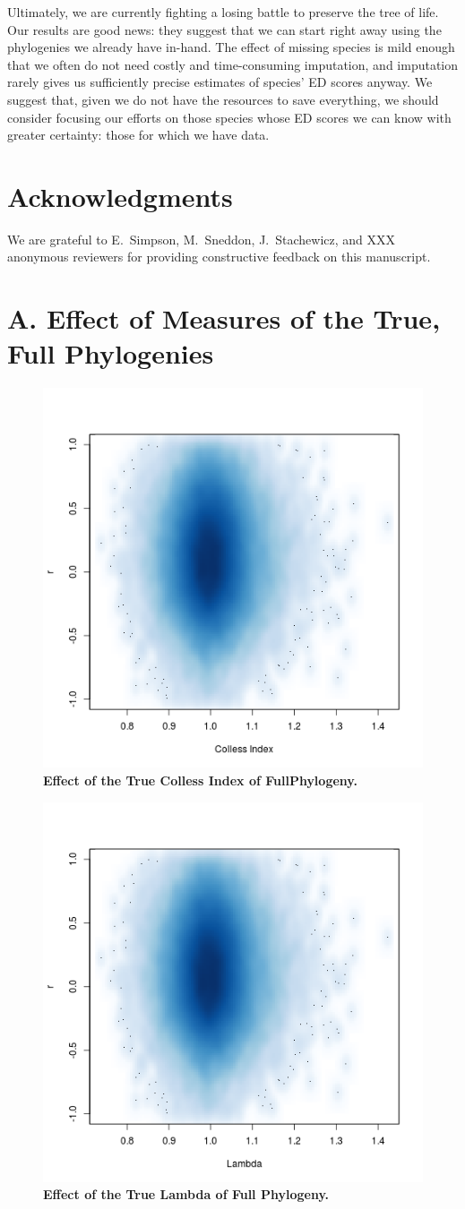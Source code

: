 \documentclass[12pt,english]{article}
\begin{document}
Ultimately, we are currently fighting a losing battle to preserve the tree of
life. Our results are good news: they suggest that we can start right away using
the phylogenies we already have in-hand. The effect of missing species is mild
enough that we often do not need costly and time-consuming imputation, and
imputation rarely gives us sufficiently precise estimates of species’ ED scores
anyway. We suggest that, given we do not have the resources to save everything,
we should consider focusing our efforts on those species whose ED scores we can
know with greater certainty: those for which we have data.

\section*{Acknowledgments}
We are grateful to E.\ Simpson, M.\ Sneddon, J.\ Stachewicz, and XXX
anonymous reviewers for providing constructive feedback on this
manuscript.

\clearpage
\printbibliography

\clearpage
\appendix
\section*{A. Effect of Measures of the True, Full Phylogenies}

\begin{figure}[!ht]
  \center
  \includegraphics[width=.5\textwidth]{trueColless.png}
  \caption{\textbf{Effect of the True Colless Index of FullPhylogeny.}}
\end{figure}

\begin{figure}[!ht]
  \center
  \includegraphics[width=.5\textwidth]{trueLambda.png}
  \caption{\textbf{Effect of the True Lambda of Full Phylogeny.}}
\end{figure}
\end{document}
